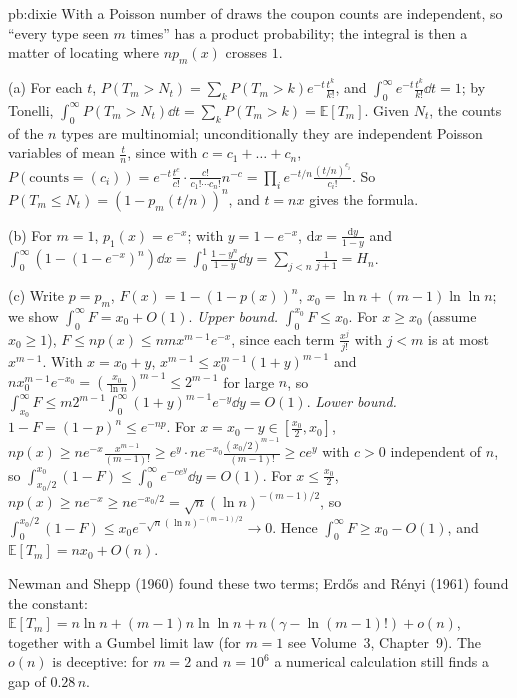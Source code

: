 \begin{solution}{pb:dixie}
\idea With a Poisson number of draws the coupon counts are independent, so ``every type seen $m$ times'' has a product probability; the integral is then a matter of
locating where $np_m(x)$ crosses $1$.

\writeup (a) For each $t$, $P(T_m>N_t)=\sum_kP(T_m>k)e^{-t}\frac{t^k}{k!}$, and $\int_0^\infty e^{-t}\frac{t^k}{k!}\dd t=1$; by Tonelli, $\int_0^\infty P(T_m>N_t)\dd t=\sum_kP(T_m>k)=\mathbb E[T_m]$. Given $N_t$,
the counts of the $n$ types are multinomial; unconditionally they are independent Poisson variables of mean $\frac tn$, since with $c=c_1+\dots+c_n$,
$P(\text{counts}=(c_i))=e^{-t}\frac{t^c}{c!}\cdot\frac{c!}{c_1!\cdots c_n!}n^{-c}=\prod_ie^{-t/n}\frac{(t/n)^{c_i}}{c_i!}$. So
$P(T_m\le N_t)=(1-p_m(t/n))^n$, and $t=nx$ gives the formula.

(b) For $m=1$, $p_1(x)=e^{-x}$; with $y=1-e^{-x}$, $\mathrm dx=\frac{\mathrm dy}{1-y}$ and $\int_0^\infty(1-(1-e^{-x})^n)\dd x=\int_0^1\frac{1-y^n}{1-y}\dd y=\sum_{j<n}\frac1{j+1}=H_n$.

(c) Write $p=p_m$, $F(x)=1-(1-p(x))^n$, $x_0=\ln n+(m-1)\ln\ln n$; we show $\int_0^\infty F=x_0+O(1)$. \emph{Upper bound.} $\int_0^{x_0}F\le x_0$. For $x\ge x_0$ (assume $x_0\ge1$),
$F\le np(x)\le nmx^{m-1}e^{-x}$, since each term $\frac{x^j}{j!}$ with $j<m$ is at most $x^{m-1}$. With $x=x_0+y$, $x^{m-1}\le x_0^{m-1}(1+y)^{m-1}$ and
$nx_0^{m-1}e^{-x_0}=(\frac{x_0}{\ln n})^{m-1}\le2^{m-1}$ for large $n$, so $\int_{x_0}^\infty F\le m2^{m-1}\int_0^\infty(1+y)^{m-1}e^{-y}\dd y=O(1)$.
\emph{Lower bound.} $1-F=(1-p)^n\le e^{-np}$. For $x=x_0-y\in[\frac{x_0}2,x_0]$, $np(x)\ge ne^{-x}\frac{x^{m-1}}{(m-1)!}\ge e^y\cdot ne^{-x_0}\frac{(x_0/2)^{m-1}}{(m-1)!}\ge ce^y$ with $c>0$ independent of $n$, so
$\int_{x_0/2}^{x_0}(1-F)\le\int_0^\infty e^{-ce^y}\dd y=O(1)$. For $x\le\frac{x_0}2$, $np(x)\ge ne^{-x}\ge ne^{-x_0/2}=\sqrt n(\ln n)^{-(m-1)/2}$, so $\int_0^{x_0/2}(1-F)\le x_0e^{-\sqrt n(\ln n)^{-(m-1)/2}}\to0$.
Hence $\int_0^\infty F\ge x_0-O(1)$, and $\mathbb E[T_m]=nx_0+O(n)$.

\leads Newman and Shepp (1960) found these two terms; Erd\H os and R\'enyi (1961) found the constant: $\mathbb E[T_m]=n\ln n+(m-1)n\ln\ln n+n(\gamma-\ln(m-1)!)+o(n)$,
together with a Gumbel limit law (for $m=1$ see Volume~3, Chapter~9). The $o(n)$ is deceptive: for $m=2$ and $n=10^6$ a numerical calculation still finds a gap of $0.28\,n$.
\end{solution}

